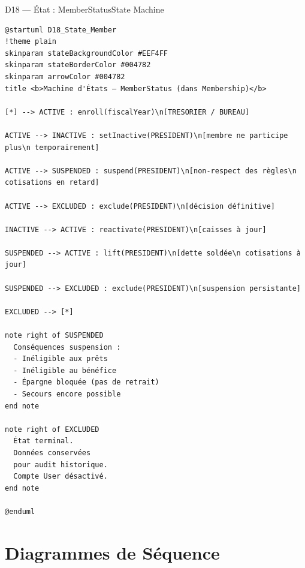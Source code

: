 \documentclass[12pt, a4paper]{report}
\begin{document}
\begin{diagramBox}{D18 — État : MemberStatus}{State Machine}
\begin{lstlisting}
@startuml D18_State_Member
!theme plain
skinparam stateBackgroundColor #EEF4FF
skinparam stateBorderColor #004782
skinparam arrowColor #004782
title <b>Machine d'États — MemberStatus (dans Membership)</b>

[*] --> ACTIVE : enroll(fiscalYear)\n[TRESORIER / BUREAU]

ACTIVE --> INACTIVE : setInactive(PRESIDENT)\n[membre ne participe plus\n temporairement]

ACTIVE --> SUSPENDED : suspend(PRESIDENT)\n[non-respect des règles\n cotisations en retard]

ACTIVE --> EXCLUDED : exclude(PRESIDENT)\n[décision définitive]

INACTIVE --> ACTIVE : reactivate(PRESIDENT)\n[caisses à jour]

SUSPENDED --> ACTIVE : lift(PRESIDENT)\n[dette soldée\n cotisations à jour]

SUSPENDED --> EXCLUDED : exclude(PRESIDENT)\n[suspension persistante]

EXCLUDED --> [*]

note right of SUSPENDED
  Conséquences suspension :
  - Inéligible aux prêts
  - Inéligible au bénéfice
  - Épargne bloquée (pas de retrait)
  - Secours encore possible
end note

note right of EXCLUDED
  État terminal.
  Données conservées
  pour audit historique.
  Compte User désactivé.
end note

@enduml
\end{lstlisting}
\end{diagramBox}

\chapter{Diagrammes de Séquence}
\end{document}
